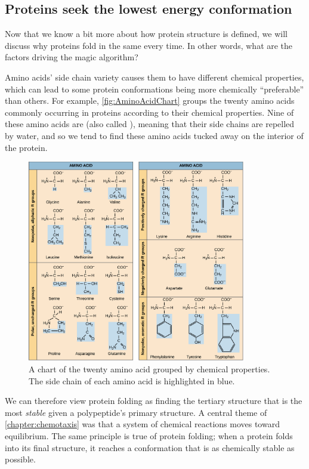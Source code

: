 \FloatBarrier
\subsection{Proteins seek the lowest energy conformation}

Now that we know a bit more about how protein structure is defined, we will discuss why proteins fold in the same every time. In other words, what are the factors driving the magic algorithm?

Amino acids' side chain variety causes them to have different chemical properties, which can lead to some protein conformations being more chemically ``preferable'' than others. For example, \autoref{fig:AminoAcidChart} groups the twenty amino acids commonly occurring in proteins according to their chemical properties. Nine of these amino acids are  (also called ), meaning that their side chains are repelled by water, and so we tend to find these amino acids tucked away on the interior of the protein.

\begin{figure}[h]
	\centering
	\mySfFamily
	\includegraphics[width = 0.85\textwidth]{../images/AminoAcidChart.png}
	\caption{A chart of the twenty amino acid grouped by chemical properties. The side chain of each amino acid is highlighted in blue.}
	\label{fig:AminoAcidChart}
\end{figure}

We can therefore view protein folding as finding the tertiary structure that is the most \textit{stable} given a polypeptide's primary structure. A central theme of \autoref{chapter:chemotaxis} was that a system of chemical reactions moves toward equilibrium. The same principle is true of protein folding; when a protein folds into its final structure, it reaches a conformation that is as chemically stable as possible.


